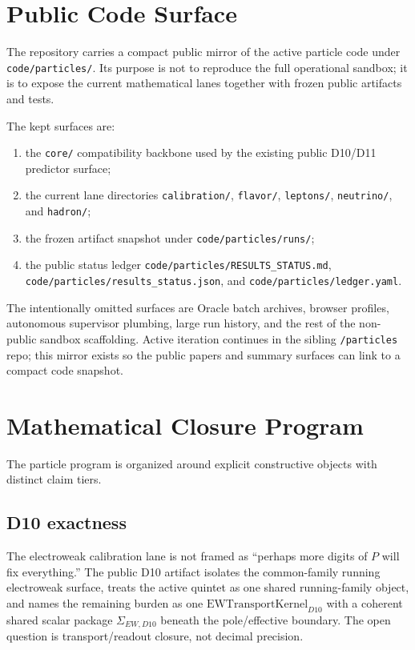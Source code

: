 \documentclass[11pt]{article}
\begin{document}
\section{Public Code Surface}

The repository carries a compact public mirror of the active particle code
under \texttt{code/particles/}. Its purpose is not to reproduce the full
operational sandbox; it is to expose the current mathematical lanes together
with frozen public artifacts and tests.

The kept surfaces are:
\begin{enumerate}[leftmargin=2em]
\item the \texttt{core/} compatibility backbone used by the existing public
D10/D11 predictor surface;
\item the current lane directories
\texttt{calibration/}, \texttt{flavor/}, \texttt{leptons/},
\texttt{neutrino/}, and \texttt{hadron/};
\item the frozen artifact snapshot under \texttt{code/particles/runs/};
\item the public status ledger
\texttt{code/particles/RESULTS\_STATUS.md},
\texttt{code/particles/results\_status.json}, and
\texttt{code/particles/ledger.yaml}.
\end{enumerate}

The intentionally omitted surfaces are Oracle batch archives, browser profiles,
autonomous supervisor plumbing, large run history, and the rest of the
non-public sandbox scaffolding. Active iteration continues in the sibling
\texttt{/particles} repo; this mirror exists so the public papers and summary
surfaces can link to a compact code snapshot.

\section{Mathematical Closure Program}

The particle program is organized around explicit constructive objects with
distinct claim tiers.

\subsection{D10 exactness}

The electroweak calibration lane is not framed as ``perhaps more digits of
\(P\) will fix everything.'' The public D10 artifact isolates the common-family
running electroweak surface, treats the active quintet as one shared
running-family object, and names the remaining burden as one
\(\mathrm{EWTransportKernel}_{D10}\) with a coherent shared scalar package
\(\Sigma_{EW,D10}\) beneath the pole/effective boundary. The open question is
transport/readout closure, not decimal precision.
\end{document}
